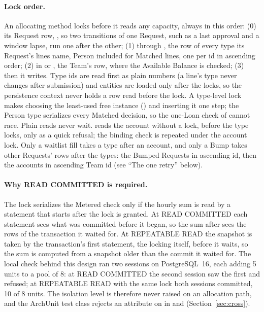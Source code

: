 \paragraph{Lock order.} An allocating method locks before it reads any capacity, always in this order: (0) its Request row, , so two transitions of one Request, such as a last approval and a window lapse, run one after the other; (1) through , the  row of every type its Request's lines name, Person included for Matched lines, one  per id in ascending order; (2) in  or , the Team's  row, where the Available Balance is checked; (3) then it writes. Type ids are read first as plain numbers (a line's type never changes after submission) and entities are loaded only after the locks, so the persistence context never holds a row read before the lock. A type-level lock makes choosing the least-used free instance () and inserting it one step; the Person type serializes every Matched decision, so the one-Loan check of  cannot race. Plain reads never wait.  reads the account without a lock, before the type locks, only as a quick refusal; the binding check is repeated under the account lock. Only a waitlist fill takes a type after an account, and only a Bump takes other Requests' rows after the types: the Bumped Requests in ascending id, then the accounts in ascending Team id (see ``The one retry'' below).

\paragraph{Why READ COMMITTED is required.} The lock serializes the Metered check only if the hourly sum is read by a statement that starts after the lock is granted. At READ COMMITTED each statement sees what was committed before it began, so the sum after  sees the rows of the transaction it waited for. At REPEATABLE READ the snapshot is taken by the transaction's first statement, the locking  itself, before it waits, so the sum is computed from a snapshot older than the commit it waited for. The local check behind this design ran two sessions on PostgreSQL~16, each adding 5 units to a pool of 8: at READ COMMITTED the second session saw the first and refused; at REPEATABLE READ with the same lock both sessions committed, 10 of 8 units. The isolation level is therefore never raised on an allocation path, and the ArchUnit test class rejects an  attribute on  in  and  (Section~\ref{sec:cross}).


